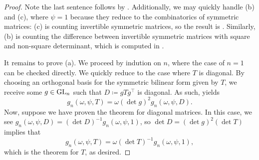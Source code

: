 \begin{proof}
    Note the last sentence follows by . Additionally, we may quickly handle (b) and (c), where $\psi=1$ because they reduce to the combinatorics of symmetric matrices: (c) is counting invertible symmetric matrices, so the result is \cite[Theorem~7.5.2]{hach-gf}. Similarly, (b) is counting the difference between invertible symmetric matrices with square and non-square determinant, which is computed in \cite[p.~163]{macwilliams-ortho-matrices}.
    
    It remains to prove (a). We proceed by indution on $n$, where the case of $n=1$ can be checked directly. We quickly reduce to the case where $T$ is diagonal. By choosing an orthogonal basis for the symmetric bilinear form given by $T$, we receive some $g\in\mathrm{GL}_n$ such that $D\coloneqq gTg^\intercal$ is diagonal. As such,  yields
    \[g_n(\omega,\psi,T) = \omega(\det g)^2g_n(\omega,\psi,D).\]
    Now, suppose we have proven the theorem for diagonal matrices. In this case, we see $g_n(\omega,\psi,D)=(\det D)^{-1}g_n(\omega,\psi,1)$, so $\det D=(\det g)^2(\det T)$ implies that
    \[g_n(\omega,\psi,T)=\omega(\det T)^{-1}g_n(\omega,\psi,1),\]
    which is the theorem for $T$, as desired.


\end{proof}
